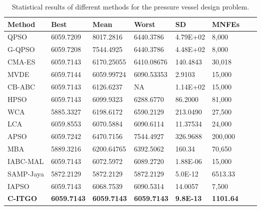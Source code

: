 
\begin{table*}[tp]
    \tiny
    \begin{center}
    
    \begin{tabular}{ P{2.0cm} P{2.0cm} P{2.0cm} P{2.0cm} P{2.0cm} P{2.0cm} P{2.0cm} P{2.0cm}  }
    \hline
    \textbf{Method} & \textbf{Best} & \textbf{Mean} & \textbf{Worst} & \textbf{SD} & \textbf{MNFEs} \\
    \hline
    
    QPSO & 6059.7209 & 8017.2816 & 6440.3786 & 4.79E+02 & 8,000 \\
    G-QPSO & 6059.7208 & 7544.4925 & 6440.3786 & 4.48E+02 & 8,000 \\
    CMA-ES & 6059.7143 & 6170.25055 & 6410.08676 & 140.4843 & 30,018 \\
    MVDE & 6059.7144 & 6059.99724 & 6090.53353 & 2.9103 & 15,000 \\ 
    CB-ABC & 6059.7143 & 6126.6237 & NA & 1.14E+02 & 15,000 \\
    HPSO & 6059.7143 & 6099.9323 & 6288.6770 & 86.2000 & 81,000 \\
    WCA & 5885.3327 & 6198.6172 & 6590.2129 & 213.0490 & 27,500 \\
    LCA & 6059.8553 & 6070.5884 & 6090.6114 & 11.37534 & 24,000 \\
    APSO & 6059.7242 & 6470.7156 & 7544.4927 & 326.9688 & 200,000 \\
    MBA & 5889.3216 & 6200.64765 & 6392.5062 & 160.34 & 70,650 \\    
    IABC-MAL & 6059.7143 & 6072.5972 & 6089.2720 & 1.88E-06 & 15,000 \\
    SAMP-Jaya & 5872.2129 & 5872.2129 & 5872.2129 & 5.0E-12 & 6513.33 \\    
    IAPSO & 6059.7143 & 6068.7539 & 6090.5314 & 14.0057 & 7,500 \\
    \textbf{C-ITGO} & \bf{6059.7143} & \bf{6059.7143} & \bf{6059.7143} & \bf{9.8E-13} & \bf{1101.64} \\
    
    \hline
    \end{tabular}
    \end{center}
    \vspace*{-6mm}
    \caption{Statistical results of different methods for the pressure vessel design problem. \\[1em]}
    \label{tab:PV}
    \end{table*}
    
    